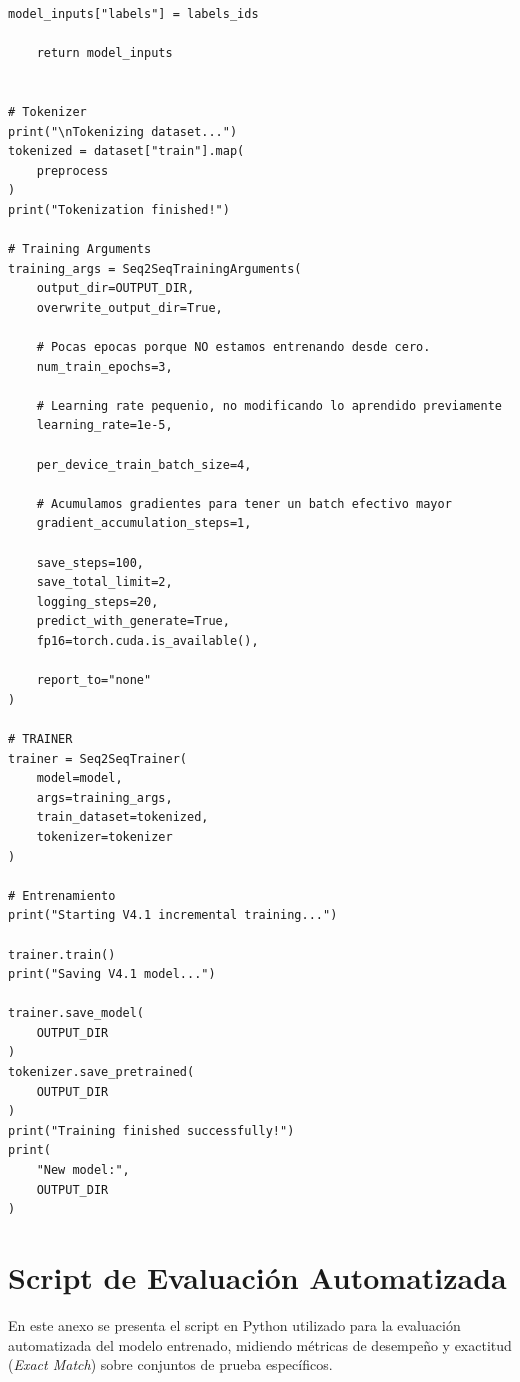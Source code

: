 \begin{lstlisting}[caption={Script principal para el fine-tuning e entrenamiento incremental de CodeT5 (train.py)}, label={anx:train-script}]
    model_inputs["labels"] = labels_ids

    return model_inputs


# Tokenizer
print("\nTokenizing dataset...")
tokenized = dataset["train"].map(
    preprocess
)
print("Tokenization finished!")

# Training Arguments
training_args = Seq2SeqTrainingArguments(
    output_dir=OUTPUT_DIR,
    overwrite_output_dir=True,

    # Pocas epocas porque NO estamos entrenando desde cero.
    num_train_epochs=3,

    # Learning rate pequenio, no modificando lo aprendido previamente
    learning_rate=1e-5,

    per_device_train_batch_size=4,

    # Acumulamos gradientes para tener un batch efectivo mayor
    gradient_accumulation_steps=1,

    save_steps=100,
    save_total_limit=2,
    logging_steps=20,
    predict_with_generate=True,
    fp16=torch.cuda.is_available(),

    report_to="none"
)

# TRAINER
trainer = Seq2SeqTrainer(
    model=model,
    args=training_args,
    train_dataset=tokenized,
    tokenizer=tokenizer
)

# Entrenamiento
print("Starting V4.1 incremental training...")

trainer.train()
print("Saving V4.1 model...")

trainer.save_model(
    OUTPUT_DIR
)
tokenizer.save_pretrained(
    OUTPUT_DIR
)
print("Training finished successfully!")
print(
    "New model:",
    OUTPUT_DIR
)
\end{lstlisting}

\chapter{Script de Evaluación Automatizada}
\label{anx:script-evaluacion}

En este anexo se presenta el script en Python utilizado para la evaluación automatizada del modelo entrenado, midiendo métricas de desempeño y exactitud (\textit{Exact Match}) sobre conjuntos de prueba específicos.


